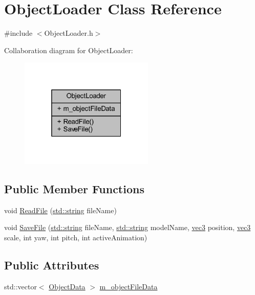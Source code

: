 \hypertarget{class_object_loader}{}\section{Object\+Loader Class Reference}
\label{class_object_loader}


{\ttfamily \#include $<$Object\+Loader.\+h$>$}



Collaboration diagram for Object\+Loader\+:\nopagebreak
\begin{figure}[H]
\begin{center}
\leavevmode
\includegraphics[width=181pt]{class_object_loader__coll__graph}
\end{center}
\end{figure}
\subsection*{Public Member Functions}
\begin{DoxyCompactItemize}
\item 
void \hyperlink{class_object_loader_a3638b2958cb2ff6cd204a2cbcbaf2fd3}{Read\+File} (\hyperlink{_types_8h_ad453f9f71ce1f9153fb748d6bb25e454}{std\+::string} file\+Name)
\item 
void \hyperlink{class_object_loader_a92e3f603901802a85c29819b3b9acc79}{Save\+File} (\hyperlink{_types_8h_ad453f9f71ce1f9153fb748d6bb25e454}{std\+::string} file\+Name, \hyperlink{_types_8h_ad453f9f71ce1f9153fb748d6bb25e454}{std\+::string} model\+Name, \hyperlink{_types_8h_a3d0ce73e3199de81565fb01632415288}{vec3} position, \hyperlink{_types_8h_a3d0ce73e3199de81565fb01632415288}{vec3} scale, int yaw, int pitch, int active\+Animation)
\end{DoxyCompactItemize}
\subsection*{Public Attributes}
\begin{DoxyCompactItemize}
\item 
std\+::vector$<$ \hyperlink{struct_object_data}{Object\+Data} $>$ \hyperlink{class_object_loader_a3110eee250161ee33d7ac24f23489d11}{m\+\_\+object\+File\+Data}
\end{DoxyCompactItemize}


